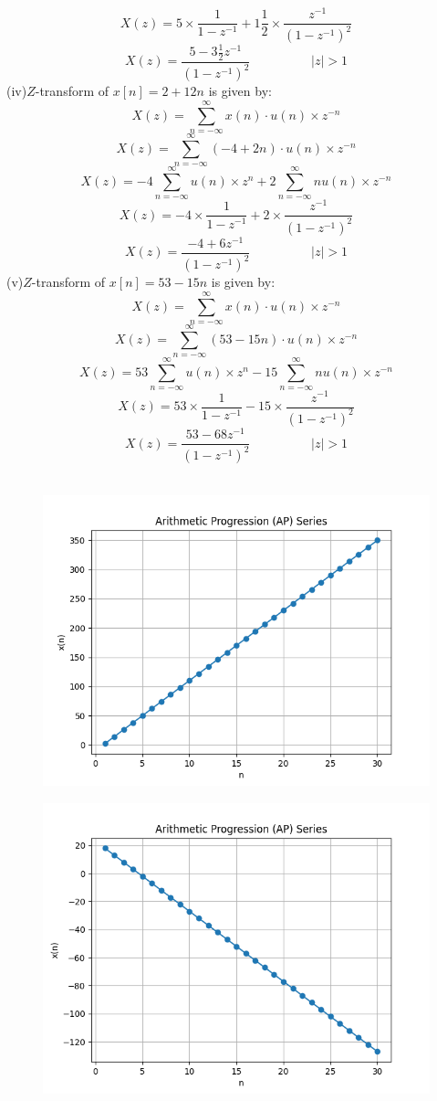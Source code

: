 \documentclass[journal,12pt,twocolumn]{IEEEtran}
\theoremstyle{remark}
\begin{document}
\[X(z)=5 \times \frac{1}{1-{z^{-1}}}+ 1\frac{1}{2}\times \frac{z^{-1}}{(1-{z^{-1}})^2}\]
\[X(z)=\frac{5-3\frac{1}{2}{z^{-1}}}{(1-{z^{-1}})^2} \hspace{2cm}  |z|>1\]
(iv)$Z$-transform of $x[n] = 2 + 12n$ is given by:
\[ X(z) = \sum_{n=-\infty}^{\infty} x(n)\cdot u(n)\times z^{-n} \]
\[ X(z) = \sum_{n=-\infty}^{\infty} (-4 + 2n)\cdot u(n) \times z^{-n} \]
\[X(z)=-4 \sum_{n=-\infty}^{\infty}u(n) \times z^{n}+2 \sum_{n=-\infty}^{\infty} nu(n) \times z^{-n}\]
\[X(z)=-4 \times \frac{1}{1-{z^{-1}}}+ 2 \times \frac{z^{-1}}{(1-{z^{-1}})^2}\]
\[X(z)=\frac{-4+6{z^{-1}}}{(1-{z^{-1}})^2} \hspace{2cm}  |z|>1\]
(v)$Z$-transform of $x[n] = 53 - 15n$ is given by:
\[ X(z) = \sum_{n=-\infty}^{\infty} x(n)\cdot u(n)\times z^{-n} \]
\[ X(z) = \sum_{n=-\infty}^{\infty} (53 - 15n)\cdot u(n) \times z^{-n} \]
\[X(z)=53 \sum_{n=-\infty}^{\infty}u(n)\times z^{n}-15 \sum_{n=-\infty}^{\infty} nu(n)\times z^{-n}\]
\[X(z)=53 \times \frac{1}{1-{z^{-1}}}- 15 \times \frac{z^{-1}}{(1-{z^{-1}})^2}\]
\[X(z)=\frac{53-68{z^{-1}}}{(1-{z^{-1}})^2} \hspace{2cm}  |z|>1\]\\
\begin{figure}[h]
       \vspace*{-1cm}
       \centering
        \includegraphics[width=0.8\linewidth]{figures/download.png} %
        \caption{}
   \label{fig:your_label}
\end{figure}
\begin{figure}[h]
      \vspace*{-1cm}
      \centering
       \includegraphics[width=0.8\linewidth]{figures/download2.png} %
        \caption{}
    \end{figure}
\end{document}
